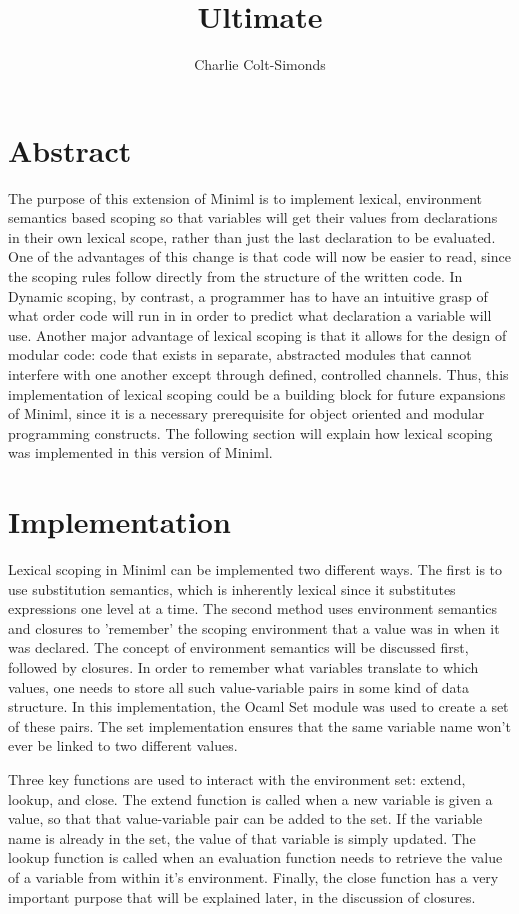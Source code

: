 \documentclass[12pt,letter]{article}
\title{Ultimate}
\author{Charlie Colt-Simonds}
\begin{document}
    \section{Abstract}
        The purpose of this extension of Miniml is to implement lexical, environment semantics based scoping so that variables will get their values from declarations in their own lexical scope, rather than just the last declaration to be evaluated. One of the advantages of this change is that code will now be easier to read, since the scoping rules follow directly from the structure of the written code. In Dynamic scoping, by contrast, a programmer has to have an intuitive grasp of what order code will run in in order to predict what declaration a variable will use. Another major advantage of lexical scoping is that it allows for the design of modular code: code that exists in separate, abstracted modules that cannot interfere with one another except through defined, controlled channels. Thus, this implementation of lexical scoping could be a building block for future expansions of Miniml, since it is a necessary prerequisite for object oriented and modular programming constructs. The following section will explain how lexical scoping was implemented in this version of Miniml.
    \section{Implementation}
        Lexical scoping in Miniml can be implemented two different ways. The first is to use substitution semantics, which is inherently lexical since it substitutes expressions one level at a time. The second method uses environment semantics and closures to 'remember' the scoping environment that a value was in when it was declared. The concept of environment semantics will be discussed first, followed by closures. In order to remember what variables translate to which values, one needs to store all such value-variable pairs in some kind of data structure. In this implementation, the Ocaml Set module was used to create a set of these pairs. The set implementation ensures that the same variable name won't ever be linked to two different values. 
        
        Three key functions are used to interact with the environment set: extend, lookup, and close. The extend function is called when a new variable is given a value, so that that value-variable pair can be added to the set. If the variable name is already in the set, the value of that variable is simply updated. The lookup function is called when an evaluation function needs to retrieve the value of a variable from within it's environment. Finally, the close function has a very important purpose that will be explained later, in the discussion of closures. 
        
\end{document}
